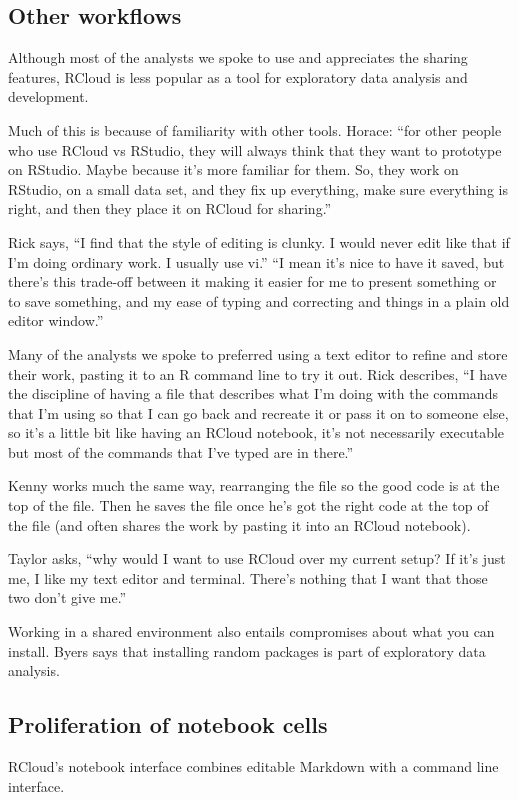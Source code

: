 \subsection{Other workflows}
Although most of the analysts we spoke to use and appreciates the sharing
features, RCloud is less popular as a tool for exploratory data analysis and
development.

Much of this is because of familiarity with other tools. Horace: ``for other
people who use RCloud vs RStudio, they will always think that they want to
prototype on RStudio. Maybe because it's more familiar for them. So, they work
on RStudio, on a small data set, and they fix up everything, make sure
everything is right, and then they place it on RCloud for sharing.''

Rick says, ``I find that the style of editing is clunky. I would never edit like that
if I'm doing ordinary work. I usually use vi.'' ``I mean it's nice to have it
saved, but there's this trade-off between it making it easier for me to present
something or to save something, and my ease of typing and correcting and things
in a plain old editor window.''

Many of the analysts we spoke to preferred using a text editor to refine and
store their work, pasting it to an R command line to try it out. Rick describes,
``I have the discipline of having a file that describes what I'm doing with the
commands that I'm using so that I can go back and recreate it or pass it on to
someone else, so it's a little bit like having an RCloud notebook, it's not
necessarily executable but most of the commands that I've typed are in there.''

Kenny works much the same way, rearranging the file so the good code is at the top of
the file. Then he saves the file once he's got the right code at
the top of the file (and often shares the work by pasting it into an RCloud notebook).

Taylor asks, ``why would I want to use RCloud over my
current setup? If it's just me, I like my text editor and terminal. There's
nothing that I want that those two don't give me.''

Working in a shared environment also entails compromises about what you can
install. Byers says that installing random packages is part of exploratory data
analysis.


\subsection{Proliferation of notebook cells}
RCloud's notebook interface combines editable Markdown with a command line
interface.

